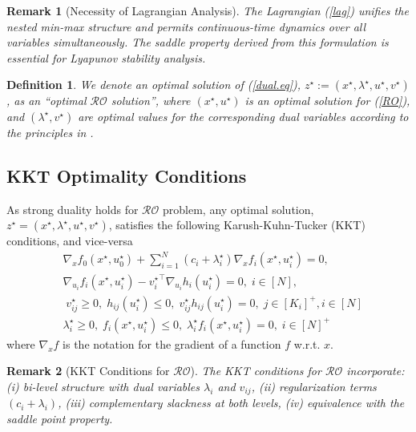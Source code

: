 \documentclass[journal,twoside,web]{ieeecolor}
\newcommand{\rev}[1]{\textcolor{revisionblue}{#1}}
\newtheorem{definition}{Definition}
\newtheorem{remark}{Remark}
\begin{document}
\begin{remark}[\rev{Necessity of Lagrangian Analysis}]
The Lagrangian (\ref{lag}) unifies the nested min-max structure and permits continuous-time dynamics over all variables simultaneously. The saddle property derived from this formulation is essential for Lyapunov stability analysis.
\end{remark}

\begin{definition} \label{optimal_ro}
We denote an optimal solution of (\ref{dual.eq}), $z^\star:=(x^\star,\lambda^\star,u^\star,v^\star)$, as an ``optimal $\mathcal{RO}$ solution'', where $(x^\star, u^\star)$ is an optimal solution for (\ref{RO}), and $(\lambda^\star, v^\star)$ are optimal values for the corresponding dual variables according to the principles in \cite[Section~5.9.1]{boyd2004}.
\end{definition}

\subsection*{\rev{KKT Optimality Conditions}}

As strong duality holds for $\mathcal{RO}$ problem, any optimal solution, $z^\star=(x^\star,\lambda^\star,u^\star,v^\star)$, satisfies the following Karush-Kuhn-Tucker (KKT) conditions, and vice-versa \cite{boyd2004}
\begin{align}
&\nabla_x f_0(x^\star,u_0^\star)+  \sum_{i=1}^N(c_i+\lambda^\star_i) \nabla_x f_i(x^\star,u_i^\star)=0,\label{kkt1}\\
&\nabla_{u_i} f_i(x^\star,u_i^\star)-{v_i^\star}^\top \nabla_{u_i} h_i(u_i^\star)=0,\; i\in[N],\label{kkt2}\\
&\;v_{ij}^\star\geq 0,\; h_{ij}(u_i^\star)\leq 0,\;v_{ij}^\star h_{ij}(u_i^\star)=0,\;  j\in[K_i]^+, i\in[N] \label{kkt3}\\
&\lambda_i^\star\geq 0,\;f_{i}(x^\star,u_i^\star)\leq 0,\;\lambda_i^\star f_{i}(x^\star,u_i^\star)=0,\;i\in[N]^+ \label{kkt4}
\end{align}
where $\nabla_x f$ is the notation for the gradient of a function $f$ w.r.t. $x$.

\begin{remark}[\rev{KKT Conditions for $\mathcal{RO}$}]
The KKT conditions for $\mathcal{RO}$ incorporate: (i) bi-level structure with dual variables $\lambda_i$ and $v_{ij}$, (ii) regularization terms $(c_i + \lambda_i)$, (iii) complementary slackness at both levels, (iv) equivalence with the saddle point property.
\end{remark}
\end{document}
